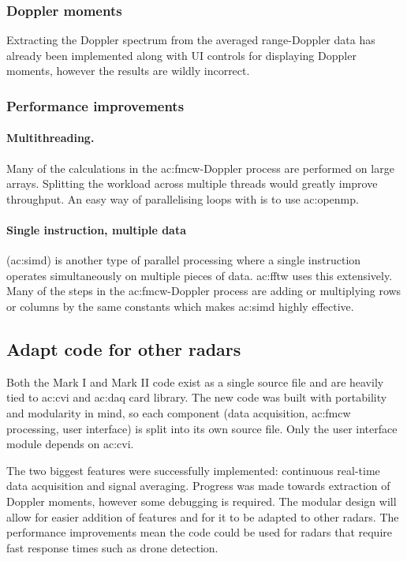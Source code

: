 \documentclass{article}
\begin{document}
\subsubsection{Doppler moments}
Extracting the Doppler spectrum from the averaged range-Doppler data has already been implemented along with UI controls for displaying Doppler moments, however the results are wildly incorrect. 

\subsubsection{Performance improvements}
\paragraph{Multithreading.} Many of the calculations in the \acrshort{ac:fmcw}-Doppler process are performed on large arrays. Splitting the workload across multiple threads would greatly improve throughput. An easy way of parallelising loops with is to use \acrshort{ac:openmp}.

\paragraph{Single instruction, multiple data} (\acrshort{ac:simd}) is another type of parallel processing where a single instruction operates simultaneously on multiple pieces of data. \acrshort{ac:fftw} uses this extensively. Many of the steps in the \acrshort{ac:fmcw}-Doppler process are adding or multiplying rows or columns by the same constants which makes \acrshort{ac:simd} highly effective.

\subsection{Adapt code for other radars}
Both the Mark I and Mark II code exist as a single source file and are heavily tied to \acrshort{ac:cvi} and \acrshort{ac:daq} card library. The new code was built with portability and modularity in mind, so each component (data acquisition, \acrshort{ac:fmcw} processing, user interface) is split into its own source file. Only the user interface module depends on \acrshort{ac:cvi}.


The two biggest features were successfully implemented: continuous real-time data acquisition and signal averaging. Progress was made towards extraction of Doppler moments, however some debugging is required. The modular design will allow for easier addition of features and for it to be adapted to other radars. The performance improvements mean the code could be used for radars that require fast response times such as drone detection.


\clearpage
\printbibliography
\end{document}
